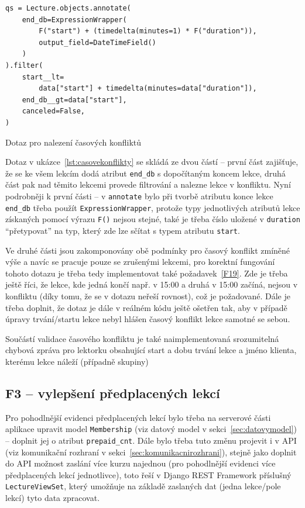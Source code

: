 \begin{listing}[ht]
	\begin{verbatim}
qs = Lecture.objects.annotate(
    end_db=ExpressionWrapper(
        F("start") + (timedelta(minutes=1) * F("duration")),
        output_field=DateTimeField()
    )
).filter(
    start__lt=
        data["start"] + timedelta(minutes=data["duration"]),
    end_db__gt=data["start"],
    canceled=False,
)
	\end{verbatim}
	\caption{Dotaz pro nalezení časových konfliktů}\label{lst:casovekonflikty}
\end{listing}

Dotaz v ukázce~\ref{lst:casovekonflikty} se skládá ze dvou částí -- první část zajišťuje, že se ke všem lekcím dodá atribut \verb|end_db| s dopočítaným koncem lekce, druhá část pak nad těmito lekcemi provede filtrování a nalezne lekce v konfliktu. Nyní podrobněji k první části -- v \verb|annotate| bylo při tvorbě atributu konce lekce \verb|end_db| třeba použít \verb|ExpressionWrapper|, protože typy jednotlivých atributů lekce získaných pomocí výrazu \verb|F()| nejsou stejné, také je třeba číslo uložené v \verb|duration| \enquote{přetypovat} na typ, který zde lze sčítat s typem atributu \verb|start|.

Ve druhé části jsou zakomponovány obě podmínky pro časový konflikt zmíněné výše a navíc se pracuje pouze se zrušenými lekcemi, pro korektní fungování tohoto dotazu je třeba tedy implementovat také požadavek~\ref{F19}. Zde je třeba ještě říci, že lekce, kde jedná končí např. v 15:00 a druhá v 15:00 začíná, nejsou v konfliktu (díky tomu, že se v dotazu neřeší rovnost), což je požadované. Dále je třeba doplnit, že dotaz je dále v reálném kódu ještě ošetřen tak, aby v případě úpravy trvání/startu lekce nebyl hlášen časový konflikt lekce samotné se sebou.

Součástí validace časového konfliktu je také naimplementovaná srozumitelná chybová zpráva pro lektorku obsahující start a dobu trvání lekce a jméno klienta, kterému lekce náleží (případně skupiny)

\subsection{F3 -- vylepšení předplacených lekcí}

Pro pohodlnější evidenci předplacených lekcí bylo třeba na serverové části aplikace upravit model \verb|Membership| (viz datový model v sekci~\ref{sec:datovymodel}) -- doplnit jej o atribut \verb|prepaid_cnt|. Dále bylo třeba tuto změnu projevit i v API (viz komunikační rozhraní v sekci~\ref{sec:komunikacnirozhrani}), stejně jako doplnit do API možnost zaslání více kurzu najednou (pro pohodlnější evidenci více předplacených lekcí jednotlivce), toto řeší v Django REST Framework příslušný \verb|LectureViewSet|, který umožňuje na základě zaslaných dat (jedna lekce/pole lekcí) tyto data zpracovat.


